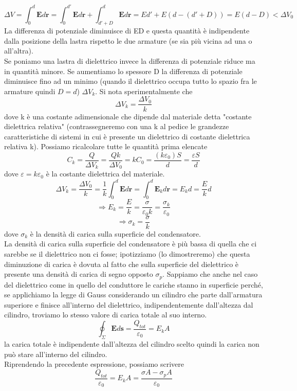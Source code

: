 \documentclass[
10pt, %
a4paper, %
oneside, %
headinclude,footinclude, %
BCOR5mm, %
]{scrartcl}
\begin{document}
\[\Delta V = \int_{0}^{d}\mathbf{E}d\mathbf{r} = \int_{0}^{d'}\mathbf{E}d\mathbf{r} + \int_{d'+D}^{d}\mathbf{E}d\mathbf{r} = Ed' + E(d-(d'+D)) = E(d-D) < \Delta V_0 \]
La differenza di potenziale diminuisce di ED e questa quantità è indipendente dalla posizione della lastra rispetto le due armature (se sia più vicina ad una o all'altra).\\
Se poniamo una lastra di dielettrico invece la differenza di potenziale riduce ma in quantità minore. Se aumentiamo lo spessore D la differenza di potenziale diminuisce fino ad un minimo (quando il dielettrico occupa tutto lo spazio fra le armature quindi \(D = d\)) $\Delta V_k$. Si nota sperimentalmente che 
\[\Delta V_k = \frac{\Delta V_0}{k}\]
dove k è una costante adimensionale che dipende dal materiale detta "costante dielettrica relativa" (contrassegneremo con una k al pedice le grandezze caratteristiche di sistemi in cui è presente un dielettrico di costante dielettrica relativa k). Possiamo ricalcolare tutte le quantità prima elencate
\[C_k = \frac{Q}{\Delta V_k} = \frac{Qk}{\Delta V_0} = kC_0 = \frac{(k\varepsilon_0)S}{d} = \frac{\varepsilon S}{d}\]
dove $\varepsilon = k\varepsilon_0$ è la costante dielettrica del materiale. 
\[\Delta V_k = \frac{\Delta V_0}{k} = \frac{1}{k}\int_{0}^{d}\mathbf{E}d\mathbf{r} = \int_{0}^{d}\mathbf{E}_kd\mathbf{r} = E_kd = \frac{E}{k}d \]
\[\Rightarrow E_k = \frac{E}{k}= \frac{\sigma}{\varepsilon_0 k} = \frac{\sigma_k}{\varepsilon_0}\]
\[\Rightarrow \sigma_k = \frac{\sigma}{k}\]
dove $\sigma_k$ è la densità di carica sulla superficie del condensatore.\\
La densità di carica sulla superficie del condensatore è più bassa di quella che ci sarebbe se il dielettrico non ci fosse; ipotizziamo (lo dimostreremo) che questa diminuzione di carica è dovuta al fatto che sulla superficie del dielettrico è presente una densità di carica di segno opposto \(\sigma_p\). Sappiamo che anche nel caso del dielettrico come in quello del conduttore le cariche stanno in superficie perché, se applichiamo la legge di Gauss considerando un cilindro che parte dall'armatura superiore e finisce all'interno del dielettrico, indipendentemente dall'altezza dal cilindro, troviamo lo stesso valore di carica totale al suo interno.
\[\oint_\Sigma \mathbf{E}d\mathbf{s} = \frac{Q_{tot}}{\varepsilon_0} = E_k A \]
la carica totale è indipendente dall'altezza del cilindro scelto quindi la carica non può stare all'interno del cilindro.\\
Riprendendo la precedente espressione, possiamo scrivere
 \[\frac{Q_{tot}}{\varepsilon_0} = E_k A = \frac{\sigma A - \sigma_p A}{\varepsilon_0}\]
\end{document}
